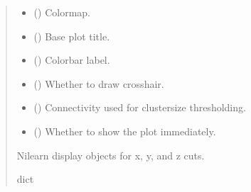 \documentclass[letterpaper,10pt,english]{sphinxhowto}
\begin{document}
\begin{fulllineitems}
\begin{quote}
\begin{description}
\begin{itemize}
\item {} 
\sphinxAtStartPar
{} (\sphinxstyleliteralemphasis{\sphinxupquote{, }}) \textendash{} Colormap.

\item {} 
\sphinxAtStartPar
{} (\sphinxstyleliteralemphasis{\sphinxupquote{, }}) \textendash{} Base plot title.

\item {} 
\sphinxAtStartPar
{} (\sphinxstyleliteralemphasis{\sphinxupquote{, }}) \textendash{} Colorbar label.

\item {} 
\sphinxAtStartPar
{} (\sphinxstyleliteralemphasis{\sphinxupquote{, }}) \textendash{} Whether to draw crosshair.

\item {} 
\sphinxAtStartPar
{} (\sphinxstyleliteralemphasis{\sphinxupquote{, }}) \textendash{} Connectivity used for cluster\sphinxhyphen{}size thresholding.

\item {} 
\sphinxAtStartPar
{} (\sphinxstyleliteralemphasis{\sphinxupquote{, }}) \textendash{} Whether to show the plot immediately.

\end{itemize}

\sphinxAtStartPar
{} \textendash{} Nilearn display objects for x, y, and z cuts.

\sphinxAtStartPar
dict

\end{description}\end{quote}

\end{fulllineitems}
\end{document}
